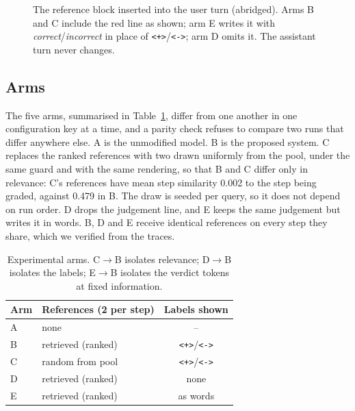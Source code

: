 \documentclass[11pt]{article}
\newcommand{\pos}{\texttt{<+>}}
\newcommand{\negt}{\texttt{<->}}
\newcommand{\arm}[1]{\textsc{#1}}
\begin{document}
\begin{figure}[t]
\centering
{}
\caption{The reference block inserted into the user turn (abridged). Arms \arm{B} and \arm{C}
include the red line as shown; arm \arm{E} writes it with \textit{correct}/\textit{incorrect} in
place of \pos/\negt; arm \arm{D} omits it. The assistant turn never changes.}
\label{fig:prompt}
\end{figure}

\subsection{Arms}

The five arms, summarised in Table~\ref{tab:arms}, differ from one another in one configuration
key at a time, and a parity check refuses to compare two runs that differ anywhere else.
\arm{A} is the unmodified model. \arm{B} is the proposed system. \arm{C} replaces the ranked
references with two drawn uniformly from the pool, under the same guard and with the same
rendering, so that \arm{B} and \arm{C} differ only in relevance: \arm{C}'s references have mean
step similarity 0.002 to the step being graded, against 0.479 in \arm{B}. The draw is seeded per
query, so it does not depend on run order. \arm{D} drops the judgement line, and \arm{E} keeps
the same judgement but writes it in words. \arm{B}, \arm{D} and \arm{E} receive identical
references on every step they share, which we verified from the traces.

\begin{table}[t]
\centering
\small
\begin{tabular}{llc}
\toprule
Arm & References (2 per step) & Labels shown \\
\midrule
\arm{A} & none & -- \\
\arm{B} & retrieved (ranked) & \pos/\negt \\
\arm{C} & random from pool & \pos/\negt \\
\arm{D} & retrieved (ranked) & none \\
\arm{E} & retrieved (ranked) & as words \\
\bottomrule
\end{tabular}
\caption{Experimental arms. \arm{C}$\to$\arm{B} isolates relevance; \arm{D}$\to$\arm{B}
isolates the labels; \arm{E}$\to$\arm{B} isolates the verdict tokens at fixed information.}
\label{tab:arms}
\end{table}
\end{document}
